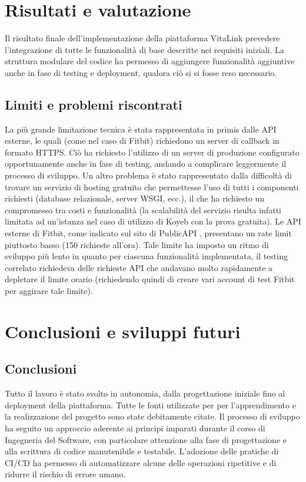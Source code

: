 \documentclass[12pt,a4paper,oneside]{report}
\begin{document}
\chapter{Risultati e valutazione}
Il risultato finale dell'implementazione della piattaforma VitaLink prevedere l'integrazione di tutte le funzionalità di base descritte nei requisiti iniziali.
La struttura modulare del codice ha permesso di aggiungere funzionalità aggiuntive anche in fase di testing e deployment, qualora ciò si si fosse reso necessario.

\section{Limiti e problemi riscontrati}
La più grande limitazione tecnica è stata rappresentata in primis dalle API esterne, le quali (come nel caso di Fitbit) richiedono un server di callback in formato HTTPS.
Ciò ha richiesto l'utilizzo di un server di produzione configurato opportunamente anche in fase di testing, andando a complicare leggermente il processo di sviluppo.
Un altro problema è stato rappresentato dalla difficoltà di trovare un servizio di hosting gratuito che permettesse l'uso di tutti i componenti richiesti (database relazionale, server WSGI, ecc.), il che ha richiesto un compromesso tra costi e funzionalità (la scalabilità del servizio risulta infatti limitata ad un'istanza nel caso di utilizzo di Koyeb con la prova gratuita).
Le API esterne di Fitbit, come indicato sul sito di PublicAPI \cite{fitbit_API_rate}, presentano un rate limit piuttosto basso (150 richieste all'ora). Tale limite ha imposto un ritmo di sviluppo più lento in quanto per ciascuna funzionalità implementata, il testing correlato richiedeva delle richieste API che andavano molto rapidamente a depletare il limite orario (richiedendo quindi di creare vari account di test Fitbit per aggirare tale limite).

\chapter{Conclusioni e sviluppi futuri}
\section{Conclusioni}
Tutto il lavoro è stato svolto in autonomia, dalla progettazione iniziale fino al deployment della piattaforma.
Tutte le fonti utilizzate per per l'apprendimento e la realizzazione del progetto sono state debitamente citate.
Il processo di sviluppo ha seguito un approccio aderente ai principi imparati durante il corso di Ingegneria del Software, con particolare attenzione alla fase di progettazione e alla scrittura di codice manutenibile e testabile.
L'adozione delle pratiche di CI/CD ha permesso di automatizzare alcune delle operazioni ripetitive e di ridurre il rischio di errore umano.
\end{document}

